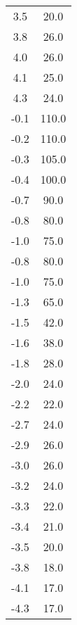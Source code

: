 \begin{table}
\begin{minipage}{0.25\textwidth}
\begin{tabular}{c|c}
        \midrule
        3.5 &20.0\\
        3.8 &26.0\\
        4.0 &26.0\\
        4.1 &25.0\\
        4.3 &24.0\\
        -0.1 &110.0\\
        -0.2 &110.0\\
        -0.3 &105.0\\
        -0.4 &100.0\\
        -0.7 &90.0\\
        -0.8 &80.0\\
        -1.0 &75.0\\
        -0.8 &80.0\\
        -1.0 &75.0\\
        -1.3 &65.0\\
        -1.5 &42.0\\
        -1.6 &38.0\\
        -1.8 &28.0\\
        -2.0 &24.0\\
        -2.2 &22.0\\
        -2.7 &24.0\\
        -2.9 &26.0\\
        -3.0 &26.0\\
        -3.2 &24.0\\
        -3.3 &22.0\\
        -3.4 &21.0\\
        -3.5 &20.0\\
        -3.8 &18.0\\
        -4.1 &17.0\\
        -4.3 &17.0\\
		\bottomrule 
	\end{tabular}
\end{minipage}
\end{table}
